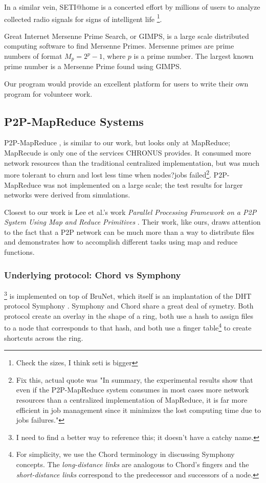 \documentclass[conference, compsocconf, letterpaper]{IEEEtran}
\begin{document}
In a similar vein, SETI@home is a concerted effort by millions of users to analyze collected radio signals for signs of intelligent life \cite{anderson2002seti}\footnote{Check the sizes, I think seti is bigger}.

Great Internet  Mersenne Prime Search, or GIMPS, is a large scale distributed computing software to find Mersenne Primes.  Mersenne primes are prime numbers of format $M_{p} = 2^{p} - 1$, where $p$ is a prime number. The largest known prime number is a Mersenne Prime found using GIMPS.
 
 
Our program would provide an excellent platform for users to write their own program for volunteer work.  



\subsection{P2P-MapReduce Systems}

P2P-MapReduce \cite{marozzo2012p2p}, is similar to our work, but looks only at MapReduce; MapRecude is only one of the services CHRONUS provides.  It consumed more network resources than the traditional centralized implementation, but was much more tolerant to churn and lost less time when nodes?jobs failed\footnote{Fix this, actual quote was "In summary, the experimental results show that even if the P2P-MapReduce system consumes in most cases more network resources than a centralized implementation of MapReduce, it is far more efficient in job management since it minimizes the lost computing time due to jobs failures."}.  P2P-MapReduce was not implemented on a large scale; the test results for larger networks were derived from simulations.

Closest to our work is Lee et al.'s work \emph{Parallel Processing Framework on a P2P System Using Map and Reduce Primitives} \cite{leemap}.  Their work, like ours, draws attention to the fact that a P2P network can be much more than a way to distribute files and demonstrates how to accomplish different tasks using map and reduce functions. 

\subsubsection{Underlying protocol: Chord vs Symphony}

\cite{leemap}\footnote{I need to find a better way to reference this; it doesn't have a  catchy name.} is implemented on top of BruNet\cite{BruNet}, which itself is an implantation of the DHT protocol Symphony \cite{symphony}.  Symphony and Chord share a great deal of symetry.  Both protocol create an overlay in the shape of a ring, both  use a hash to assign files to a node that corresponds to that hash, and both use a finger table\footnote{For simplicity, we use the Chord terminology in discussing Symphony concepts. The \emph{long-distance links} are analogous to Chord's fingers and the \emph{short-distance links} correspond to the predecessor and successors of a node.} to create shortcuts across the ring.
\end{document}
